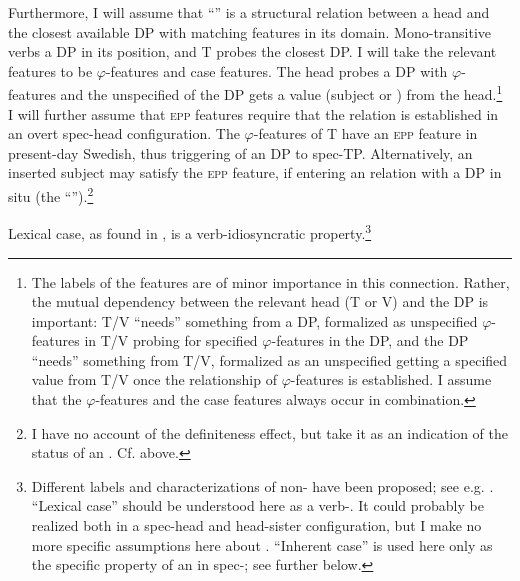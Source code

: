 \documentclass[output=paper]{langscibook}
\begin{document}
Furthermore, I will assume that “” is a  structural relation between a head and the closest available DP with matching features in its  domain. Mono-transitive verbs  a DP in its  position, and T probes the closest DP. I will take the relevant features to be $\varphi $-features and case features. The head probes a DP with $\varphi $-features and the unspecified  of the DP gets a value (subject or ) from the head.\footnote{The labels of the features are of minor importance in this connection. Rather, the mutual dependency between the relevant head (T or V) and the DP is important: T/V “needs” something from a DP, formalized as unspecified $\varphi ${}-features in T/V probing for specified $\varphi ${}-features in the DP, and the DP “needs” something from T/V, formalized as an unspecified  getting a specified value from T/V once the  relationship of $\varphi ${}-features is established. I assume that the $\varphi ${}-features and the case features always occur in combination.} I will further assume that \textsc{epp} features require that the  relation is established in an overt spec-head configuration. The $\varphi $-features of T have an \textsc{epp} feature in present-day Swedish, thus triggering  of an DP to spec-TP. Alternatively, an inserted  subject may satisfy the \textsc{epp} feature, if entering an  relation with a DP in situ (the “”).\footnote{I have no account of the definiteness effect, but take it as an indication of the status of an . Cf.  above.}



Lexical case, as found in , is a verb-idiosyncratic property.\footnote{Different labels and characterizations of non- have been proposed; see e.g. \citet[181–182]{Thrainsson2001}. “Lexical case” should be understood here as a verb-. It could probably be realized both in a spec-head and head-sister configuration, but I make no more specific assumptions here about .  “Inherent case” is used here only as the specific property of an  in spec-; see further below.} 
\end{document}
